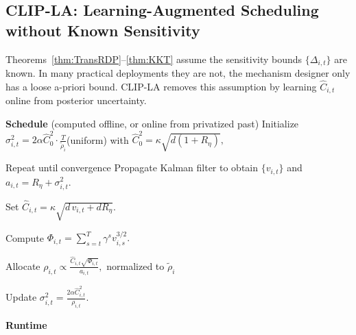\documentclass{article}
\begin{document}
\subsection{CLIP-LA: Learning-Augmented Scheduling without Known Sensitivity}

Theorems~\ref{thm:TransRDP}–\ref{thm:KKT} assume the sensitivity bounds $\{\Delta_{i,t}\}$ are known. In many practical deployments they are not, the mechanism designer only has a loose a-priori bound. CLIP-LA removes this assumption by learning $\hat C_{i,t}$ online from posterior uncertainty.

\begin{algorithm}[h!]
\caption{CLIP-LA schedule and runtime}
\label{alg:clip-la}

\textbf{Schedule} (computed offline, or online from privatized past)\;
Initialize $\sigma^2_{i,t}=2 \alpha \hat{C}_0^2 \cdot \frac{T}{\tilde{\rho}_i} $(uniform) with $ \hat{C}_0^2 = \kappa \sqrt{d(1+R_\eta)},$


Repeat until convergence\;
\Indp
Propagate Kalman filter to obtain $\{v_{i,t}\}$ and $a_{i,t} = R_\eta + \sigma^2_{i,t}.$

Set $\hat{C}_{i,t} = \kappa \sqrt{d\,v_{i,t} + d R_\eta}.$ 

Compute $\Phi_{i,t} = \sum_{s=t}^{T} \gamma^s v_{i,s}^{3/2}.$

Allocate $\rho_{i,t} \propto \frac{\hat{C}_{i,t}\sqrt{\Phi_{i,t}}}{a_{i,t}},$
normalized to $\tilde{\rho}_i$\;

Update $\sigma^2_{i,t} = \frac{2\alpha \hat{C}_{i,t}^2}{\rho_{i,t}}.$

\Indm

\textbf{Runtime}
\end{algorithm}
\end{document}
